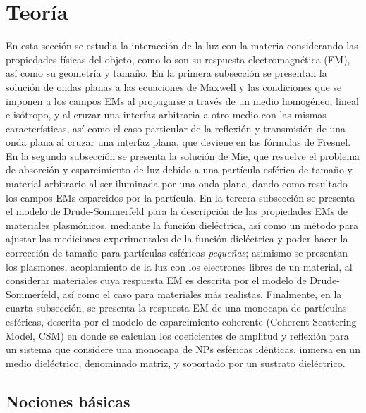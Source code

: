 \chapter{Teoría}

 En esta sección se estudia la interacción de la luz con la materia considerando las propiedades físicas del objeto, como lo son su respuesta electromagnética (EM), así como su geometría y  tamaño. En la primera subsección se presentan la  solución de ondas planas a las ecuaciones de Maxwell y las condiciones que se imponen a los campos EMs al propagarse a través de un medio homogéneo, lineal e isótropo, y al cruzar una interfaz arbitraria a otro medio con las mismas características, así como el caso particular de la reflexión y transmisión de una onda plana al cruzar una interfaz plana, que deviene en las fórmulas de Fresnel. En la segunda subsección se presenta la solución de Mie, que resuelve el problema de absorción y esparcimiento de luz debido a una partícula esférica de tamaño y material arbitrario al ser iluminada por una onda plana, dando como resultado los campos EMs esparcidos por la partícula. En la tercera subsección se presenta el modelo de Drude-Sommerfeld para la descripción de las propiedades EMs de materiales plasmónicos, mediante la función dieléctrica, así como un método para ajustar las mediciones experimentales de la función dieléctrica y poder hacer la corrección de tamaño para partículas esféricas \emph{pequeñas}; asimismo se presentan los plasmones, acoplamiento de la luz con los electrones libres de un material, al considerar materiales cuya respuesta EM es descrita por el modelo de Drude-Sommerfeld, así como el caso para materiales más realistas. Finalmente, en la cuarta subsección, se presenta la respuesta EM de una monocapa de partículas esféricas, descrita por el modelo de esparcimiento coherente (Coherent Scattering Model, CSM) en donde se calculan los coeficientes de amplitud y reflexión para un sistema que considere una monocapa de NPs esféricas idénticas, inmersa en un medio dieléctrico, denominado matriz, y soportado por un sustrato dieléctrico.

\section{Nociones básicas}

